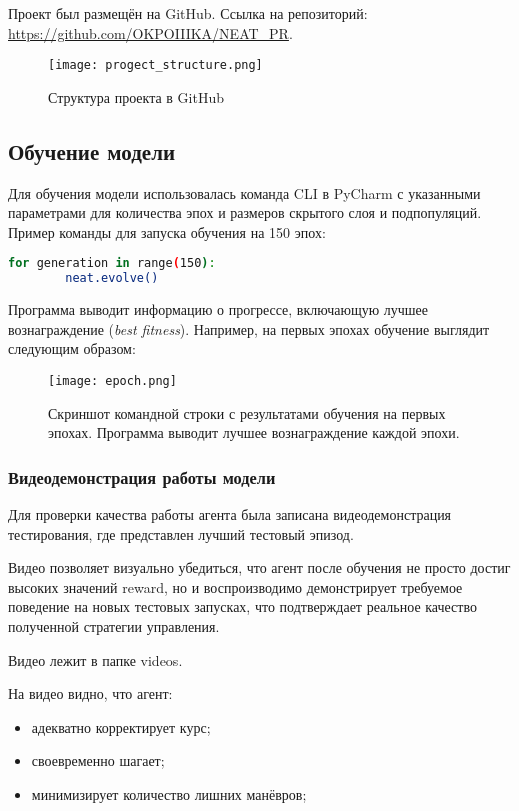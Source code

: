 \documentclass[a4paper,12pt]{article}
\begin{document}
Проект был размещён на GitHub.   
Ссылка на репозиторий: \url{https://github.com/OKPOIIIKA/NEAT_PR}.

\begin{figure}[H]
	\centering
	\texttt{[image: progect\_structure.png]}
	\caption{Структура проекта в GitHub}
	\label{fig:project_structure}
\end{figure}

\subsection{Обучение модели}

Для обучения модели использовалась команда CLI в PyCharm с указанными параметрами для количества эпох и размеров скрытого слоя и подпопуляций. Пример команды для запуска обучения на 150 эпох:
\begin{lstlisting}[language=bash]
	for generation in range(150):  
        neat.evolve()
\end{lstlisting}
Программа выводит информацию о прогрессе, включающую лучшее вознаграждение (\textit{best fitness}). Например, на первых эпохах обучение выглядит следующим образом:

\begin{figure}[H]
	\centering
	\texttt{[image: epoch.png]}
	\caption{Скриншот командной строки с результатами обучения на первых эпохах. Программа выводит лучшее вознаграждение каждой эпохи.}
	\label{fig:training_screenshot}
\end{figure}
\subsubsection{Видеодемонстрация работы модели}

Для  проверки качества работы агента была записана видеодемонстрация тестирования, где представлен лучший тестовый эпизод.

Видео позволяет визуально убедиться, что агент после обучения не просто достиг высоких значений reward, но и воспроизводимо демонстрирует требуемое поведение на новых тестовых запусках, что подтверждает реальное качество полученной стратегии управления.

Видео лежит в  папке videos.

На видео видно, что агент:
\begin{itemize}
	\item адекватно корректирует курс;
	\item своевременно шагает;
	\item минимизирует количество лишних манёвров;
\end{itemize}
\end{document}
